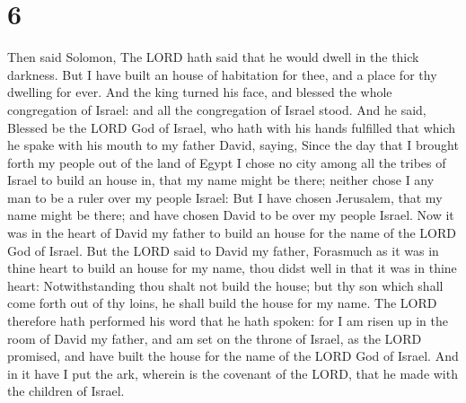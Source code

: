 \hypertarget{section-5}{%
\section{6}\label{section-5}}

 Then said Solomon, The LORD hath said that he would dwell
in the thick darkness.  But I have built an house of
habitation for thee, and a place for thy dwelling for ever. 
And the king turned his face, and blessed the whole congregation of
Israel: and all the congregation of Israel stood.  And he
said, Blessed be the LORD God of Israel, who hath with his hands
fulfilled that which he spake with his mouth to my father David, saying,
 Since the day that I brought forth my people out of the
land of Egypt I chose no city among all the tribes of Israel to build an
house in, that my name might be there; neither chose I any man to be a
ruler over my people Israel:  But I have chosen Jerusalem,
that my name might be there; and have chosen David to be over my people
Israel.  Now it was in the heart of David my father to build
an house for the name of the LORD God of Israel.  But the
LORD said to David my father, Forasmuch as it was in thine heart to
build an house for my name, thou didst well in that it was in thine
heart:  Notwithstanding thou shalt not build the house; but
thy son which shall come forth out of thy loins, he shall build the
house for my name.  The LORD therefore hath performed his
word that he hath spoken: for I am risen up in the room of David my
father, and am set on the throne of Israel, as the LORD promised, and
have built the house for the name of the LORD God of Israel.
 And in it have I put the ark, wherein is the covenant of
the LORD, that he made with the children of Israel.

